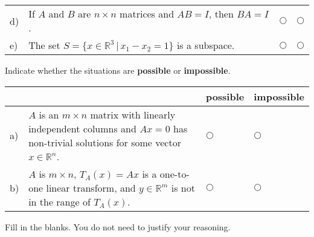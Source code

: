 \documentclass[12pt]{exam}
\begin{document}
\begin{questions}
\begin{center}
\begin{tabular}{ p{.15cm} p{14cm} p{.6cm} p{.6cm} }
        d) & If $A$ and $B$ are $n\times n$ matrices and $AB=I$, then $BA=I$. & $\bigcirc$  & $\bigcirc$ \\
        
        e) & The set $S=\{x \in \mathbb R^3 \, | \, x_1 - x_2=1\}$ is a subspace. & $\bigcirc$  & $\bigcirc$ \\ \hline
        
    \end{tabular}
    \end{center}
    \setlength{\extrarowheight}{0.0cm}

\question[2] Indicate whether the situations are \textbf{possible} or \textbf{impossible}.

    \vspace{-0.8cm}
    \setlength{\extrarowheight}{0.25cm}
    \begin{center}
    \hspace{-.9cm}\begin{tabular}{ p{0.25cm} p{10cm} p{1.4cm} p{1.75cm} }
        
        & & possible &  impossible  \\[2pt] \hline 
        
        
        a) & $A$ is an $m \times n$ matrix with linearly independent columns and $Ax=0$ has non-trivial solutions for some vector $x \in \mathbb R^n$. & $\bigcirc$  & $\bigcirc$ \\ 
        

        b) & $A$ is $m\times n$, $T_A(x)=Ax$ is a one-to-one linear transform, and $ y \in \mathbb R^m$ is not in the range of $T_A(x)$. & $\bigcirc$  & $\bigcirc$ \\[5pt]
        
        
        \hline
        
    \end{tabular}
    \end{center}
    \setlength{\extrarowheight}{0.0cm}
    \vspace{-6pt} 

    \question[4] Fill in the blanks. You do not need to justify your reasoning. 
\end{questions}
\end{document}
